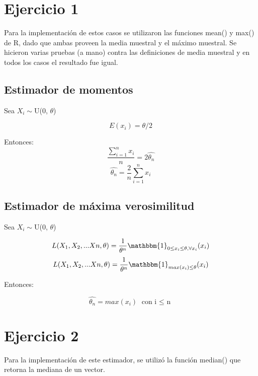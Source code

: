 \documentclass[a4paper]{article}
\begin{document}
\fecha{\today}

\newcommand{\senial}{\textit{se\~nal}}


\maketitle

\section{Ejercicio 1}
Para la implementación de estos casos se utilizaron las funciones mean() y max() de R, dado que ambas proveen la media muestral y el máximo muestral. Se hicieron varias pruebas (a mano) contra las definiciones de media muestral y en todos los casos el resultado fue igual. 

\subsection{Estimador de momentos}
Sea $X_{i}\sim$U(0, $\theta$)

\[
E(x_{i}) = \theta / 2
\]

Entonces: 
\[
\frac{\sum_{i=1}^{n}x_{i}}{n} = 2 \hat{\theta_{n}}
\]
\[
\hat{\theta_{n}} = \frac{2}{n} \sum_{i=1}^{n}x_{i}
\]



\subsection{Estimador de máxima verosimilitud}
Sea $X_{i}\sim$U(0, $\theta$)

\[
L(X_{1}, X_{2}, ... X{n}, \theta) = \frac{1}{\theta^{n}} \mathbbm{1}_{0 \leq x_{i} \leq \theta, \forall x_{i}}(x_{i}) 
\]
\[
L(X_{1}, X_{2}, ... X{n}, \theta) = \frac{1}{\theta^{n}} \mathbbm{1}_{max( x_{i}) \leq \theta}(x_{i}) 
\]

Entonces: 

\[
\hat{\theta_{n}} = max(x_{i}) \textrm{ con i $\leq$ n}
\]

\section{Ejercicio 2}
Para la implementación de este estimador, se utilizó la función median() que retorna la mediana de un vector.
\end{document}
